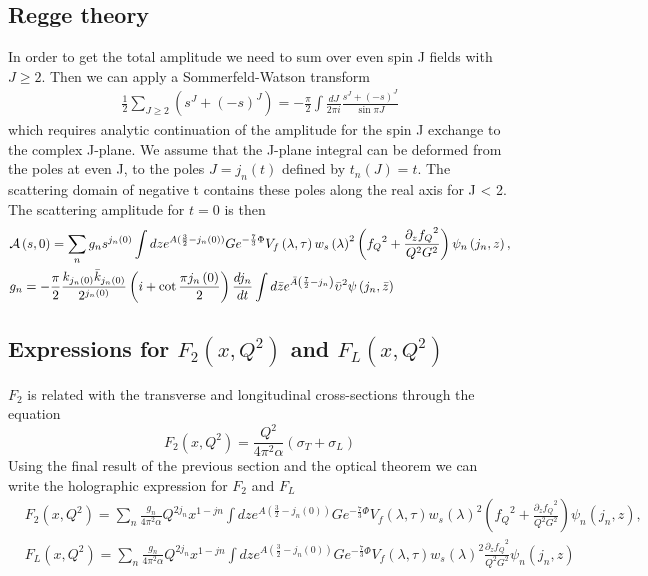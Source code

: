 \documentclass[10 pt]{article}
\begin{document}
\subsection{Regge theory}
In order to get the total amplitude we need to sum over even spin J fields with $J \geq 2$. Then we can apply a Sommerfeld-Watson transform
\begin{align}
\frac{1}{2} \sum_{J \geq 2} \left(s^J + {\left(-s\right)}^J\right) = - \frac{\pi}{2} \int \frac{d J}{2 \pi i} \frac{s^J + \left(-s\right)^J}{\sin \pi J}
\end{align}
which requires analytic continuation of the amplitude for the spin J exchange to the complex J-plane. We assume that the J-plane integral can be deformed from the poles at even J, to the poles $J = j_n \left(t\right)$ defined by $t_n \left(J\right) = t$. The scattering domain of negative t contains these poles along the real axis for J < 2. The scattering amplitude for $t = 0$ is then
\begin{align}
&\mathcal{A} \left(s, 0 \right) = \sum_n g_n s^{j_n\left(0\right)} \int dz e^{A(\frac{3}{2} - {j_n\left(0\right)})} G e^{-\frac{7}{3} \Phi}  V_f \left( \lambda, \tau \right) {w_s\left(\lambda \right)}^2  \left(  {f_Q}^2 + \frac{{\partial_z f_Q}^2}{Q^2 G^2}  \right) \psi_n \left(j_n, z\right), \\
& g_n = - \frac{\pi}{2} \frac{k_{j_n\left(0\right)} \bar{k}_{j_n\left(0\right)}}{2^{j_n\left(0\right)}}  \left(i + \cot \frac{\pi j_n\left(0\right)}{2} \right) \frac{d j_n}{dt} \int d\bar{z} e^{\bar{A}\left( \frac{7}{2} - j_n \right)}  {\bar{\upsilon}}^2  \psi\left(j_n, \bar{z}\right) \notag
\end{align}

\subsection{Expressions for $F_2\left(x, Q^2\right)$ and $F_L\left(x, Q^2\right)$}
$F_2$ is related with the transverse and longitudinal cross-sections through the equation
\begin{equation}
 F_2\left(x, Q^2\right) = \frac{Q^2}{4 \pi^2 \alpha} \left( \sigma_T + \sigma_L \right)
\end{equation}
Using the final result of the previous section and the optical theorem we can write the holographic expression for $F_2$ and $F_L$
\begin{align}
 &F_2\left(x, Q^2\right) = \sum_n \frac{g_n}{4 \pi^2 \alpha} Q^{2 j_n} x^{1-jn} \int dz e^{A(\frac{3}{2} - {j_n\left(0\right)})} G e^{-\frac{7}{3} \Phi}  V_f \left( \lambda, \tau \right) {w_s\left(\lambda \right)}^2  \left(  {f_Q}^2 + \frac{{\partial_z f_Q}^2}{Q^2 G^2}  \right) \psi_n \left(j_n, z\right), \\
& F_L\left(x, Q^2\right) = \sum_n \frac{g_n}{4 \pi^2 \alpha} Q^{2 j_n} x^{1-jn} \int dz e^{A(\frac{3}{2} - {j_n\left(0\right)})} G e^{-\frac{7}{3} \Phi}  V_f \left( \lambda, \tau \right) {w_s\left(\lambda \right)}^2  \frac{{\partial_z f_Q}^2}{Q^2 G^2} \psi_n \left(j_n, z\right)
\end{align}
\end{document}
